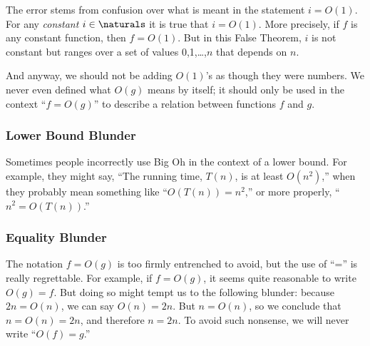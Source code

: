 The error stems from confusion over what is meant in the statement $i =
O(1)$.  For any \emph{constant} $i\in \naturals$ it is true that $i =
O(1)$.  More precisely, if $f$ is any constant function, then $f = O(1)$.
But in this False Theorem, $i$ is not constant but ranges over a set of
values 0,1,\dots,$n$ that depends on $n$.

And anyway, we should not be adding $O(1)$'s as though they were numbers.
We never even defined what $O(g)$ means by itself; it should only be used
in the context ``$f = O(g)$'' to describe a relation between functions $f$
and $g$.

\subsubsection{Lower Bound Blunder}

Sometimes people incorrectly use Big Oh in the context of a lower bound.
For example, they might say, ``The running time, $T(n)$, is at least
$O(n^2)$,'' when they probably mean something like ``$O(T(n)) = n^2$,'' or
more properly, ``$n^2 = O(T(n))$.''

\subsubsection{Equality Blunder}

The notation $f = O(g)$ is too firmly entrenched to avoid, but the use of
``='' is really regrettable.  For example, if $f = O(g)$, it seems quite
reasonable to write $O(g) = f$.  But doing so might tempt us to the
following blunder: because $2n = O(n)$, we can say $O(n) = 2n$.  But $n =
O(n)$, so we conclude that $n = O(n) = 2n$, and therefore $n = 2n$.  To
avoid such nonsense, we will never write ``$O(f) = g$.''

\endinput
